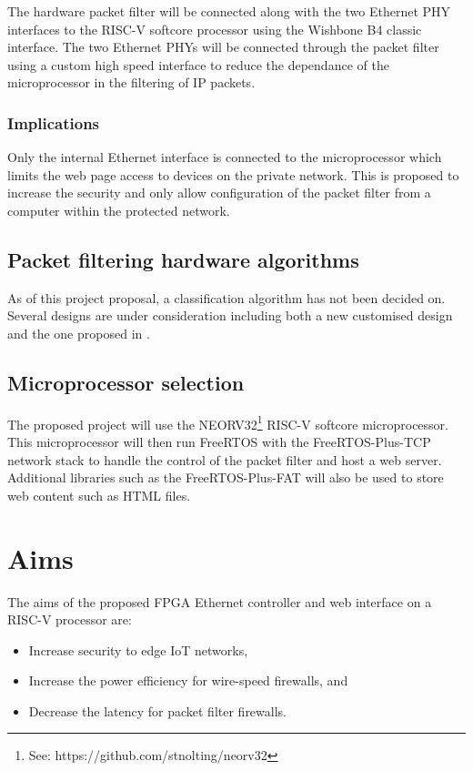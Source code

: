\newpage

The hardware packet filter will be connected along with the two Ethernet PHY interfaces to the RISC-V softcore processor using the Wishbone B4 classic interface. 
The two Ethernet PHYs will be connected through the packet filter using a custom high speed interface to reduce the dependance of the microprocessor in the 
filtering of IP packets. 

\subsubsection{Implications}

Only the internal Ethernet interface is connected to the microprocessor which limits the web page access to devices on the private network. This is proposed to 
increase the security and only allow configuration of the packet filter from a computer within the protected network.

\subsection{Packet filtering hardware algorithms}
As of this project proposal, a classification algorithm has not been decided on. Several designs are under consideration including both a new customised design and the one proposed 
in \cite{FastRecongifFPGAFirewall}.


\subsection{Microprocessor selection}
The proposed project will use the NEORV32\footnote[1]{See: https://github.com/stnolting/neorv32} RISC-V softcore microprocessor. This microprocessor will then 
run FreeRTOS with the FreeRTOS-Plus-TCP network stack to handle the control of the packet filter and host a web server. Additional libraries such as the 
FreeRTOS-Plus-FAT will also be used to store web content such as HTML files. 



\section{Aims}

The aims of the proposed FPGA Ethernet controller and web interface on a RISC-V processor are:

\begin{itemize}
    \item Increase security to edge IoT networks,
    \item Increase the power efficiency for wire-speed firewalls, and
    \item Decrease the latency for packet filter firewalls.
\end{itemize}




